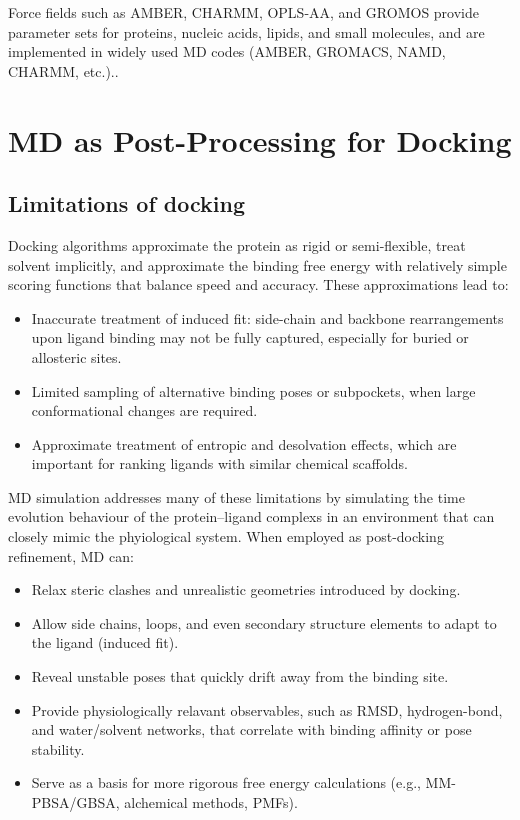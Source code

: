\documentclass[12pt]{article}
\begin{document}
Force fields such as AMBER, CHARMM, OPLS-AA, and GROMOS provide parameter sets for proteins, nucleic acids, lipids, and small molecules, and are implemented in widely used MD codes (AMBER, GROMACS, NAMD, CHARMM, etc.).\cite{CH9_salomon2013overview,CH9_Abraham2015,CH9_Phillips2020}. %

\section{MD as Post-Processing for Docking}

\subsection{Limitations of docking}

Docking algorithms approximate the protein as rigid or semi-flexible, treat solvent implicitly, and approximate the binding free energy with relatively simple scoring functions that balance speed and accuracy.\cite{CH9_Kitchen2004,CH9_Pagadala2017} These approximations lead to:

\begin{itemize}
\item Inaccurate treatment of induced fit: side-chain and backbone rearrangements upon ligand binding may not be fully captured, especially for buried or allosteric sites.
\item Limited sampling of alternative binding poses or subpockets, when large conformational changes are required.
\item Approximate treatment of entropic and desolvation effects, which are important for ranking ligands with similar chemical scaffolds.
\end{itemize}

MD simulation addresses many of these limitations by simulating the time evolution behaviour of the protein--ligand complexs in an environment that can closely mimic the phyiological system. 
When employed as post-docking refinement, MD can:

\begin{itemize}
\item Relax steric clashes and unrealistic geometries introduced by docking.
\item Allow side chains, loops, and even secondary structure elements to adapt to the ligand (induced fit).
\item Reveal unstable poses that quickly drift away from the binding site.
\item Provide physiologically relavant observables, such as RMSD, hydrogen-bond, and water/solvent networks, that correlate with binding affinity or pose stability.
\item Serve as a basis for more rigorous free energy calculations (e.g., MM-PBSA/GBSA, alchemical methods, PMFs).
\end{itemize}
\end{document}
